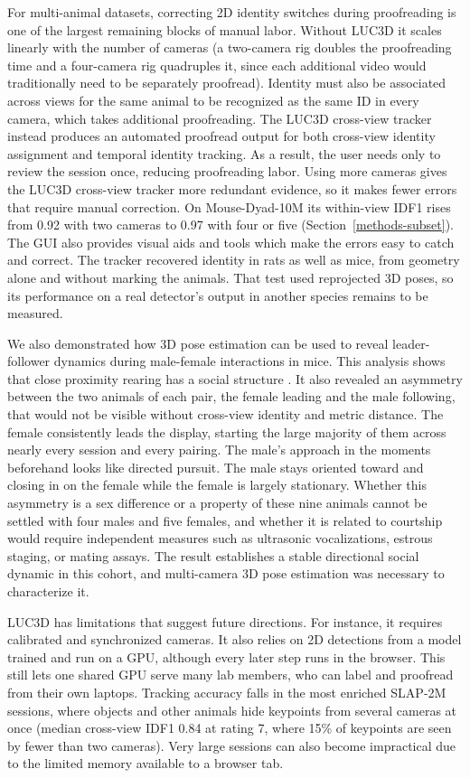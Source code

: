 \documentclass[pdflatex, sn-nature]{sn-jnl}
\theoremstyle{thmstyleone}%
\theoremstyle{thmstyletwo}%
\theoremstyle{thmstylethree}%
\begin{document}
For multi-animal datasets, correcting 2D identity switches during proofreading is one of the largest remaining blocks of manual labor. Without LUC3D it scales linearly with the number of cameras (a two-camera rig doubles the proofreading time and a four-camera rig quadruples it, since each additional video would traditionally need to be separately proofread). Identity must also be associated across views for the same animal to be recognized as the same ID in every camera, which takes additional proofreading. The LUC3D cross-view tracker instead produces an automated proofread output for both cross-view identity assignment and temporal identity tracking. As a result, the user needs only to review the session once, reducing proofreading labor. Using more cameras gives the LUC3D cross-view tracker more redundant evidence, so it makes fewer errors that require manual correction. On Mouse-Dyad-10M its within-view IDF1 rises from 0.92 with two cameras to 0.97 with four or five (Section~\ref{methods-subset}). The GUI also provides visual aids and tools which make the errors easy to catch and correct. The tracker recovered identity in rats as well as mice, from geometry alone and without marking the animals. That test used reprojected 3D poses, so its performance on a real detector's output in another species remains to be measured.

We also demonstrated how 3D pose estimation can be used to reveal leader-follower dynamics during male-female interactions in mice. This analysis shows that close proximity rearing has a social structure \citep{Dias2025, Lever2006, Leonardis2022}. It also revealed an asymmetry between the two animals of each pair, the female leading and the male following, that would not be visible without cross-view identity and metric distance. The female consistently leads the display, starting the large majority of them across nearly every session and every pairing. The male's approach in the moments beforehand looks like directed pursuit. The male stays oriented toward and closing in on the female while the female is largely stationary. Whether this asymmetry is a sex difference or a property of these nine animals cannot be settled with four males and five females, and whether it is related to courtship would require independent measures such as ultrasonic vocalizations, estrous staging, or mating assays. The result establishes a stable directional social dynamic in this cohort, and multi-camera 3D pose estimation was necessary to characterize it. 

LUC3D has limitations that suggest future directions. For instance, it requires calibrated and synchronized cameras. It also relies on 2D detections from a model trained and run on a GPU, although every later step runs in the browser. This still lets one shared GPU serve many lab members, who can label and proofread from their own laptops. Tracking accuracy falls in the most enriched SLAP-2M sessions, where objects and other animals hide keypoints from several cameras at once (median cross-view IDF1 0.84 at rating 7, where 15\% of keypoints are seen by fewer than two cameras). Very large sessions can also become impractical due to the limited memory available to a browser tab.
\end{document}
